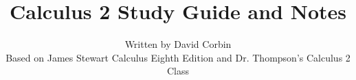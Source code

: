 \documentclass[a4paper]{article}
\begin{document}
\title{Calculus 2 Study Guide and Notes}
\date{}
\author{Written by David Corbin\\ \small{Based on James Stewart Calculus Eighth
Edition and Dr. Thompson's Calculus 2 Class}}
\maketitle{}

\theoremstyle{definition}
\newtheorem*{definition}{Theorem}





























\end{document}

